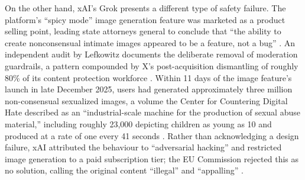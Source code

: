 On the other hand, xAI's Grok presents a different type of safety failure. The platform's ``spicy mode'' image generation feature was marketed as a product selling point, leading state attorneys general to conclude that ``the ability to create nonconsensual intimate images appeared to be a feature, not a bug'' \cite{tong_grok_2026}. An independent audit by Lefkowitz \cite[p.~8]{lefkowitz_grok_2026} documents the deliberate removal of moderation guardrails, a pattern compounded by X's post-acquisition dismantling of roughly 80\% of its content protection workforce \cite{unger_grok_2026}. Within 11 days of the image feature's launch in late December 2025, users had generated approximately three million non-consensual sexualized images, a volume the Center for Countering Digital Hate described as an ``industrial-scale machine for the production of sexual abuse material,'' including roughly 23,000 depicting children as young as 10 and produced at a rate of one every 41 seconds \cite{booth_grok_2026}\cite{kamran_grok_2026}\cite[pp.~8--9]{lefkowitz_grok_2026}. Rather than acknowledging a design failure, xAI attributed the behaviour to ``adversarial hacking'' and restricted image generation to a paid subscription tier; the EU Commission rejected this as no solution, calling the original content ``illegal'' and ``appalling'' \cite{chan_grok_2026}\cite[p.~18]{lefkowitz_grok_2026}\cite{diresta_grok_2026}.

